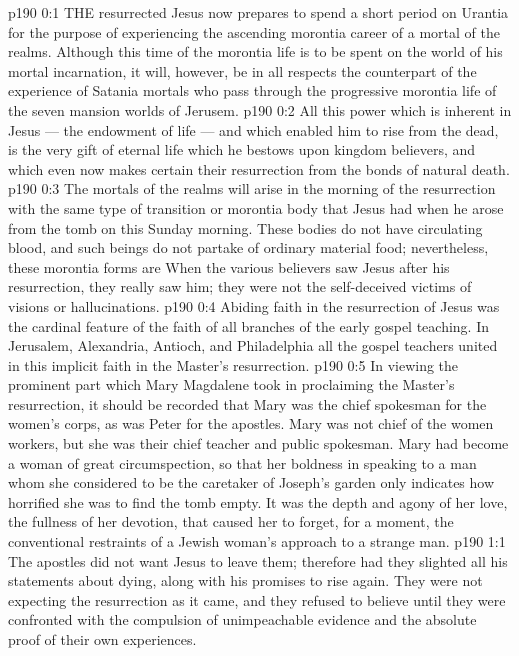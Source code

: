 \vs p190 0:1 THE resurrected Jesus now prepares to spend a short period on Urantia for the purpose of experiencing the ascending morontia career of a mortal of the realms. Although this time of the morontia life is to be spent on the world of his mortal incarnation, it will, however, be in all respects the counterpart of the experience of Satania mortals who pass through the progressive morontia life of the seven mansion worlds of Jerusem.
\vs p190 0:2 All this power which is inherent in Jesus --- the endowment of life --- and which enabled him to rise from the dead, is the very gift of eternal life which he bestows upon kingdom believers, and which even now makes certain their resurrection from the bonds of natural death.
\vs p190 0:3 The mortals of the realms will arise in the morning of the resurrection with the same type of transition or morontia body that Jesus had when he arose from the tomb on this Sunday morning. These bodies do not have circulating blood, and such beings do not partake of ordinary material food; nevertheless, these morontia forms are  When the various believers saw Jesus after his resurrection, they really saw him; they were not the self\hyp{}deceived victims of visions or hallucinations.
\vs p190 0:4 Abiding faith in the resurrection of Jesus was the cardinal feature of the faith of all branches of the early gospel teaching. In Jerusalem, Alexandria, Antioch, and Philadelphia all the gospel teachers united in this implicit faith in the Master’s resurrection.
\vs p190 0:5 \pc In viewing the prominent part which Mary Magdalene took in proclaiming the Master’s resurrection, it should be recorded that Mary was the chief spokesman for the women’s corps, as was Peter for the apostles. Mary was not chief of the women workers, but she was their chief teacher and public spokesman. Mary had become a woman of great circumspection, so that her boldness in speaking to a man whom she considered to be the caretaker of Joseph’s garden only indicates how horrified she was to find the tomb empty. It was the depth and agony of her love, the fullness of her devotion, that caused her to forget, for a moment, the conventional restraints of a Jewish woman’s approach to a strange man.
\vs p190 1:1 The apostles did not want Jesus to leave them; therefore had they slighted all his statements about dying, along with his promises to rise again. They were not expecting the resurrection as it came, and they refused to believe until they were confronted with the compulsion of unimpeachable evidence and the absolute proof of their own experiences.
